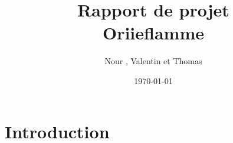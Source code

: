 \documentclass[12pt,french,a4paper]{report}
\title{\Huge Rapport de projet\\Oriieflamme}
\author{\LARGE Nour \bsc{Elbessi}, Valentin \bsc{Gardel} et Thomas \bsc{Roiseux}}
\date{\Large\today}
\begin{document}
\DontPrintSemicolon
\maketitle
\part{Introduction}
\end{document}
